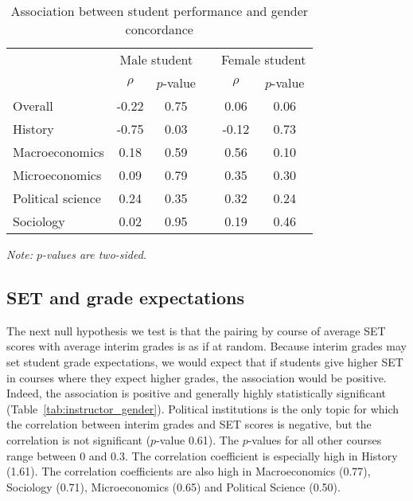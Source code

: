 \documentclass[12pt]{article}
\begin{document}
\begin{table}[htbp]
  \centering
  \footnotesize 
  \caption{Association between student performance and gender concordance}
    \begin{tabular}{lccccc}
    \toprule 
          & \multicolumn{2}{c}{Male student}  &  & \multicolumn{2}{c}{Female student} \\
      & $\rho$  &  $p$-value &  & $\rho$  &  $p$-value    \\
                             \midrule
      \quad  Overall &                 -0.22       & 0.75 & &  0.06       & 0.06  \\
      \quad  History &                 -0.75       & 0.03 & &  -0.12       & 0.73   \\
      \quad  Macroeconomics &           0.18       & 0.59 & & 0.56       & 0.10   \\
      \quad  Microeconomics &           0.09       & 0.79 & &  0.35       & 0.30  \\
      \quad  Political science &       0.24       & 0.35 & &  0.32       & 0.24  \\
      \quad  Sociology &                0.02       & 0.95 & & 0.19       & 0.46  \\
    \bottomrule
    \end{tabular}%
 \label{tab:finalconcordance}%
  
  \textit{Note: $p$-values are two-sided.}
\end{table}%
\normalsize

\subsection{SET and grade expectations}
The next null hypothesis we test is that the pairing by course of average SET scores with
average interim grades is as if at random.
Because interim grades may set student grade expectations, we would expect that if
students give higher SET in courses where they expect higher grades, the association
would be positive.
Indeed, the association is positive and generally highly statistically significant 
(Table~\ref{tab:instructor_gender}). 
Political institutions is the only topic for which the correlation between interim grades and 
SET scores is negative, but the correlation is not significant ($p$-value 0.61). 
The $p$-values for all other courses range between 0 and 0.3. 
The correlation coefficient is especially high in History (1.61). 
The correlation coefficients are also high in Macroeconomics (0.77), Sociology (0.71), 
Microeconomics (0.65) and Political Science (0.50).
\end{document}
